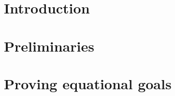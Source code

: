 \documentclass[conference]{IEEEtran}
\theoremstyle{definition}
\begin{document}



	\section{Introduction}
	\label{sec:motivating}
	

	\section{Preliminaries}
	\label{sec:preliminaries}
	

	\section{Proving equational goals}
	\label{sec:equations}
	
\end{document}
